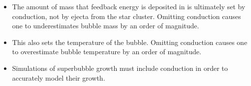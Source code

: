 \documentclass{report}
\begin{document}
\fontsize{30pt}{1em}\selectfont
\begin{itemize}
	\setlength{\itemindent}{0em}
	\item The amount of mass that feedback energy is deposited in is ultimately
		set by conduction, not by ejecta from the star cluster.  Omitting
		conduction causes one to underestimates bubble mass by an order of magnitude.
	\item This also sets the temperature of the bubble.  Omitting conduction
		causes one to overestimate bubble temperature by an order of magnitude.
	\item Simulations of superbubble growth must include conduction in order to
		accurately model their growth.
\end{itemize}
\end{document}
